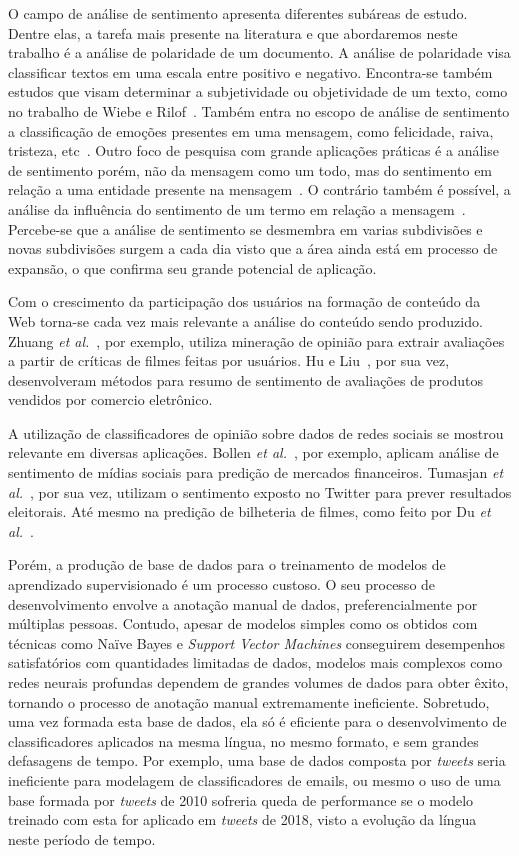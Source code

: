 O campo de análise de sentimento apresenta diferentes subáreas de estudo.
Dentre elas, a tarefa mais presente na literatura e que abordaremos neste trabalho é a análise de polaridade de um
documento.
A análise de polaridade visa classificar textos em uma escala entre positivo e negativo.
Encontra-se também estudos que visam determinar a subjetividade ou objetividade de um texto, como no trabalho de Wiebe e
Rilof~\cite{Wiebe05}.
Também entra no escopo de análise de sentimento a classificação de emoções presentes em uma mensagem, como felicidade,
raiva, tristeza, etc~\cite{bollen11b}.
Outro foco de pesquisa com grande aplicações práticas é a análise de sentimento porém, não da mensagem como um todo, mas
do sentimento em relação a uma entidade presente na mensagem~\cite{eirinaki12}.
O contrário também é possível, a análise da influência do sentimento de um termo em relação a mensagem~\cite{socher13}.
Percebe-se que a análise de sentimento se desmembra em varias subdivisões e novas subdivisões surgem a cada dia visto
que a área ainda está em processo de expansão, o que confirma seu grande potencial de aplicação.

Com o crescimento da participação dos usuários na formação de conteúdo da Web torna-se cada vez mais relevante a análise
do conteúdo sendo produzido.
Zhuang \textit{et al.}~\cite{zhuang06}, por exemplo, utiliza mineração de opinião para extrair avaliações a partir de
críticas de filmes feitas por usuários.
Hu e Liu~\cite{hu04}, por sua vez, desenvolveram métodos para resumo de sentimento de avaliações de produtos vendidos
por comercio eletrônico.

A utilização de classificadores de opinião sobre dados de redes sociais se mostrou relevante em diversas aplicações.
Bollen \textit{et al.}~\cite{bollen11}, por exemplo, aplicam análise de sentimento de mídias sociais para predição de
mercados financeiros.
Tumasjan \textit{et al.}~\cite{tumasjan10}, por sua vez, utilizam o sentimento exposto no Twitter para prever resultados
eleitorais.
Até mesmo na predição de bilheteria de filmes, como feito por Du \textit{et al.}~\cite{du14}.

Porém, a produção de base de dados para o treinamento de modelos de aprendizado supervisionado é um processo custoso.
O seu processo de desenvolvimento envolve a anotação manual de dados, preferencialmente por múltiplas pessoas.
Contudo, apesar de modelos simples como os obtidos com técnicas como Naïve Bayes e \textit{Support Vector Machines}
conseguirem desempenhos satisfatórios com quantidades limitadas de dados, modelos mais complexos como redes neurais
profundas dependem de grandes volumes de dados para obter êxito, tornando o processo de anotação manual extremamente
ineficiente.
Sobretudo, uma vez formada esta base de dados, ela só é eficiente para o desenvolvimento de classificadores aplicados
na mesma língua, no mesmo formato, e sem grandes defasagens de tempo.
Por exemplo, uma base de dados composta por \textit{tweets} seria ineficiente para modelagem de classificadores de
emails, ou mesmo o uso de uma base formada por \textit{tweets} de 2010 sofreria queda de performance se o modelo
treinado com esta for aplicado em \textit{tweets} de 2018, visto a evolução da língua neste período de tempo.

